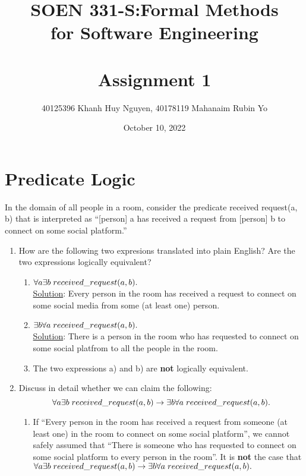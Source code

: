 \documentclass[12pt]{article}
\title{SOEN 331-S:Formal Methods\\for Software Engineering\\
\ \\
Assignment 1}
\author{40125396 Khanh Huy Nguyen, 40178119 Mahanaim Rubin Yo}
\date{October 10, 2022}
\begin{document}
\maketitle



\newpage
\section{Predicate Logic}


\noindent In the domain of all people in a room, consider the predicate received request(a, b) that is
interpreted as ``[person] a has received a request from [person] b to connect on some social platform.''
\begin{enumerate}
      \item How are the following two expresions translated into plain English? Are the two expressions logically equivalent?
            \begin{enumerate} [label=\alph*)]
                  \item \( \forall a \exists b \hspace{1mm} received\_request(a,b). \)\\
                        \noindent \underline{Solution}: Every person in the room has received a request to connect on some social media from some (at least one) person.
                  \item \(\exists b \forall a \hspace{1mm} received\_request(a,b).\)\\
                        \noindent \underline{Solution}: There is a person in the room who has requested to connect on some social platfrom to all the people in the room.
                  \item The two expressions a) and b) are {\bf not} logically equivalent.
            \end{enumerate}

      \item Discuss in detail whether we can claim the following:
            \[\forall a \exists b \hspace{1mm} received\_request(a,b) \rightarrow \exists b \forall a \hspace{1mm} received\_request(a,b).\]
            \begin{enumerate} [label=\roman*)]
                  \item If ``Every person in the room has received a request from someone (at least one) in the room to connect on some social platform'',
                        \noindent we cannot safely assumed that ``There is someone who has requested to connect on some social platform to every person in the room''.
                        \noindent It is {\bf not} the case that \(\forall a \exists b \hspace{1mm} received\_request(a,b) \rightarrow \exists b \forall a \hspace{1mm} received\_request(a,b).\)


\end{enumerate}
\end{enumerate}
\end{document}
